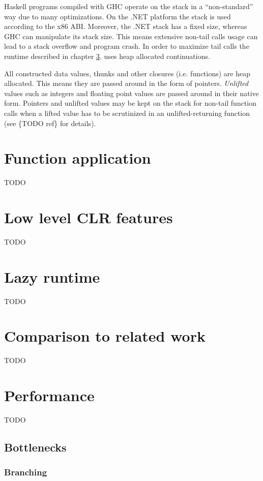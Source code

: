 \documentclass[en]{pracamgr}
\newcommand{\myref}[1]{\ref{#1}. \nameref{#1}}
\begin{document}
Haskell programs compiled with GHC operate on the stack in a ``non-standard'' way
due to many optimizations. On the .NET platform the stack is used according to the
x86 ABI. Moreover, the .NET stack has a fixed size, whereas GHC can manipulate its stack size.
This means extensive non-tail calls usage can lead to a stack overflow and program crash.
In order to maximize tail calls the runtime described in chapter \myref{r:runtime}
uses heap allocated continuations.

All constructed data values, thunks and other closures (i.e. functions) are heap allocated.
This means they are passed around in the form of pointers.
\textit{Unlifted} values such as integers and floating point values
are passed around in their native form.
Pointers and unlifted values may be kept on the stack
for non-tail function calls when a lifted value has to be scrutinized in
an unlifted-returning function (see \{TODO ref\} for details).

\chapter{Function application}\label{r:funApp}
TODO

\chapter{Low level CLR features}\label{r:lowlevel}
TODO

\chapter{Lazy runtime}\label{r:runtime}
TODO

\chapter{Comparison to related work}\label{r:alternatives}
TODO

\chapter{Performance}\label{r:perf}
TODO

\section{Bottlenecks}
\subsection{Branching}
\end{document}
